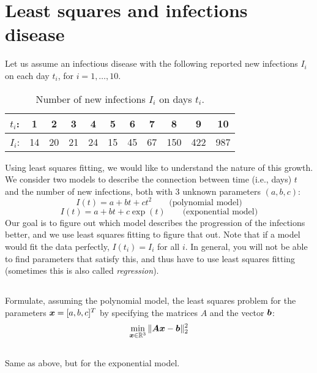 \documentclass[11pt,letterpaper]{article}
\begin{document}
\section{Least squares and infections disease}
Let us assume an infectious disease with the following reported new
infections $I_i$ on each day $t_i$, for $i=1,\ldots,10$.
\begin{table}[h]\centering
  \caption{Number of new infections $I_i$ on days $t_i$.}
  \begin{tabular}{c||c|c|c|c|c|c|c|c|c|c|}
\hline
$t_i$: & 1 & 2 & 3 & 4 & 5 & 6 & 7 & 8 & 9 & 10\\ \hline
$I_i$: & 14 & 20 & 21 & 24 & 15 & 45 & 67 & 150 & 422 & 987\\ \hline
\end{tabular}
\end{table}
Using least squares fitting, we would like to understand the nature of
this growth. We consider two models to describe the connection between
time (i.e., days) $t$ and the number of new infections, both with 3
unknown parameters $(a,b,c)$:
\begin{equation*}%
  I(t) = a + b t + c t^2 \qquad \text{(polynomial model)}
\end{equation*}
\begin{equation*}%
  I(t) = a + bt + c\exp(t) \qquad \text{(exponential model)}
\end{equation*}
Our goal is to figure out which model describes the progression of the
infections better, and we use least squares fitting to figure that
out. Note that if a model would fit the data perfectly, $I(t_i) = I_i$
for all $i$. In general, you will not be able to find parameters that
satisfy this, and thus have to use least squares fitting (sometimes
this is also called \emph{regression}).

\subsection{} Formulate, assuming the polynomial model, the least squares
  problem for the parameters $\boldsymbol{x}=[a,b,c]^T$ by specifying the
  matrices $A$ and the vector $\boldsymbol{b}$:
  $$ \min_{\boldsymbol{x}\in \mathbb R^3}\|\boldsymbol{A}\boldsymbol{x} - \boldsymbol{b} \|_2^2
  $$

\subsection{}  Same as above, but for the exponential model.
\end{document}
